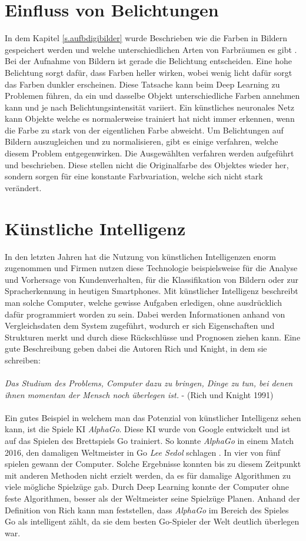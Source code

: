 \section{Einfluss von Belichtungen}\label{s.belichtung}
In dem Kapitel \ref{s.aufbdigibilder} wurde Beschrieben wie die Farben in Bildern gespeichert werden und welche unterschiedlichen Arten von Farbräumen es gibt \cite[41ff.]{burger2009digitale}. Bei der Aufnahme von Bildern ist gerade die Belichtung entscheiden. Eine hohe Belichtung sorgt dafür, dass Farben heller wirken, wobei wenig licht dafür sorgt das Farben dunkler erscheinen. Diese Tatsache kann beim Deep Learning zu Problemen führen, da ein und dasselbe Objekt unterschiedliche Farben annehmen kann und je nach Belichtungsintensität variiert. Ein künstliches neuronales Netz kann Objekte welche es normalerweise trainiert hat nicht immer erkennen, wenn die Farbe zu stark von der eigentlichen Farbe abweicht. Um Belichtungen auf Bildern auszugleichen und zu normalisieren, gibt es einige verfahren, welche diesem Problem entgegenwirken. Die Ausgewählten verfahren werden aufgeführt und beschrieben. Diese stellen nicht die Originalfarbe des Objektes wieder her, sondern sorgen für eine konstante Farbvariation, welche sich nicht stark verändert.
\section{Künstliche Intelligenz}\label{s.ki}
In den letzten Jahren hat die Nutzung von künstlichen Intelligenzen enorm zugenommen und Firmen nutzen diese Technologie beispielsweise für die Analyse und Vorhersage von Kundenverhalten, für die Klassifikation von Bildern oder zur Spracherkennung in heutigen Smartphones. Mit künstlicher Intelligenz beschreibt man solche Computer, welche gewisse Aufgaben erledigen, ohne ausdrücklich dafür programmiert worden zu sein. Dabei werden Informationen anhand von Vergleichsdaten dem System zugeführt, wodurch er sich Eigenschaften und Strukturen merkt und durch diese Rückschlüsse und Prognosen ziehen kann. Eine gute Beschreibung geben dabei die Autoren Rich und Knight, in dem sie schreiben:\\\\
 \textit{Das Studium des Problems, Computer dazu zu bringen, Dinge zu tun, bei denen ihnen momentan der Mensch noch überlegen ist.} - (Rich und Knight 1991)\\\\
Ein gutes Beispiel in welchem man das Potenzial von künstlicher Intelligenz sehen kann, ist die Spiele KI  \textit{AlphaGo}. Diese KI wurde von Google entwickelt und ist auf das Spielen des Brettspiels Go trainiert. So konnte \textit{AlphaGo} in einem Match 2016, den damaligen Weltmeister in Go \textit{Lee Sedol} schlagen \cite{Alpha2016GO}. In vier von fünf spielen gewann der Computer. Solche Ergebnisse konnten bis zu diesem Zeitpunkt mit anderen Methoden nicht erzielt werden, da es für damalige Algorithmen zu viele mögliche Spielzüge gab. Durch Deep Learning konnte der Computer ohne feste Algorithmen, besser als der Weltmeister seine Spielzüge Planen. Anhand der Definition von Rich kann man feststellen, dass  \textit{AlphaGo}  im Bereich des Spieles Go als intelligent zählt, da sie dem besten Go-Spieler der Welt deutlich überlegen war.
